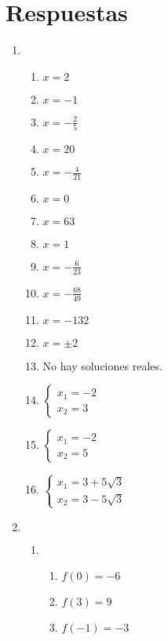 \documentclass{article}
\begin{document}
\section*{Respuestas}
\begin{enumerate}[label=\textsc{\roman*}.]
    \item    \begin{enumerate}[label=\arabic*.]
             \item $x = 2$
             \item $x = -1$
             \item $x = -\frac{2}{5}$
             \item $x = 20$
             \item $x = -\frac{4}{21}$
             \item $x = 0$
             \item $x = 63$
             \item $x = 1$
             \item $x = -\frac{6}{23}$
             \item $x = -\frac{68}{49}$
             \item $x = -132$
             \item $x = \pm 2$
             \item No hay soluciones reales.
             \item $\left\{\begin{array}{lr} x_1 =  -2 \\ x_2 = 3 \end{array} \right.$
             \item $\left\{\begin{array}{lr} x_1 =  -2 \\ x_2 = 5 \end{array} \right.$
             \item $\left\{\begin{array}{lr} x_1 =  3 + 5\sqrt3 \\ x_2 = 3 - 5\sqrt3 \end{array} \right.$
             \end{enumerate}
    \item { $\;$
        \begin{enumerate}[label=\arabic*.]
            \item \begin{enumerate}[label=\alph*)]
                    \item $f(0) = -6$
                    \item $f(3) = 9$
                    \item $f(-1) = -3$

\end{enumerate}
\end{enumerate}}
\end{enumerate}
\end{document}
